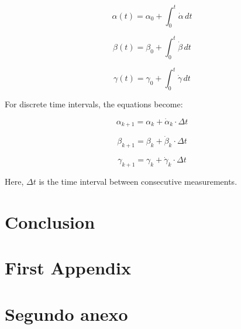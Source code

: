 \documentclass[12pt]{article}
\begin{document}
\begin{equation}
\label{eq:alpha_integral}
\alpha(t) = \alpha_0 + \int_0^t \dot{\alpha} \, dt
\end{equation}

\begin{equation}
\label{eq:beta_integral}
\beta(t) = \beta_0 + \int_0^t \dot{\beta} \, dt
\end{equation}

\begin{equation}
\label{eq:gamma_integral}
\gamma(t) = \gamma_0 + \int_0^t \dot{\gamma} \, dt
\end{equation}

For discrete time intervals, the equations become:

\begin{equation}
\label{eq:alpha_discrete}
\alpha_{k+1} = \alpha_k + \dot{\alpha}_k \cdot \Delta t
\end{equation}

\begin{equation}
\label{eq:beta_discrete}
\beta_{k+1} = \beta_k + \dot{\beta}_k \cdot \Delta t
\end{equation}

\begin{equation}
\label{eq:gamma_discrete}
\gamma_{k+1} = \gamma_k + \dot{\gamma}_k \cdot \Delta t
\end{equation}

Here, \( \Delta t \) is the time interval between consecutive measurements.



\section{Conclusion}

\lipsum[1] \cite{refs1, refs2, refs3}




\appendix  
\clearpage
\addappheadtotoc 
\appendixpage 

\section{First Appendix}

\lipsum[1]

\section{Segundo anexo}

\lipsum[1]
\end{document}
